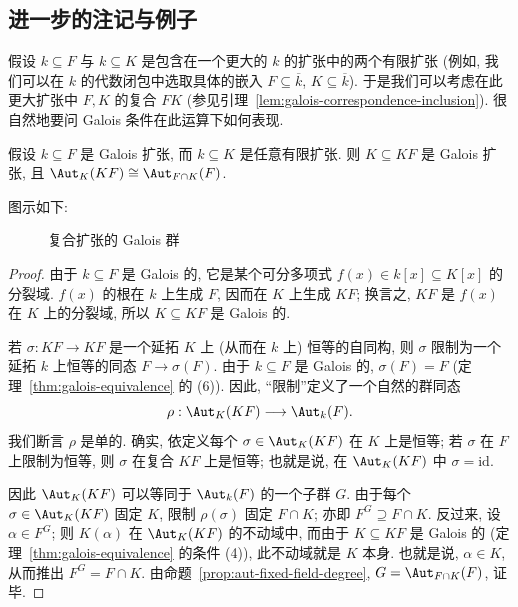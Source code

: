 \subsection{进一步的注记与例子}\label{subsec:galois-further}

假设 $k\subseteq F$ 与 $k\subseteq K$ 是包含在一个更大的 $k$ 的扩张中的两个有限扩张 (例如, 我们可以在 $k$ 的代数闭包中选取具体的嵌入 $F\subseteq\overline{k}$, $K\subseteq\overline{k}$). 于是我们可以考虑在此更大扩张中 $F,K$ 的复合 $FK$ (参见引理~\ref{lem:galois-correspondence-inclusion}). 很自然地要问 Galois 条件在此运算下如何表现.

\begin{proposition}\label{prop:composite-galois}
假设 $k\subseteq F$ 是 Galois 扩张, 而 $k\subseteq K$ 是任意有限扩张. 则 $K\subseteq KF$ 是 Galois 扩张, 且 $\Aut_K(KF)\cong\Aut_{F\cap K}(F)$.
\end{proposition}

图示如下:

\begin{figure}[h]
\centering
{}
\caption{复合扩张的 Galois 群}
\label{fig:prop617-composite}
\end{figure}

\begin{proof}
由于 $k\subseteq F$ 是 Galois 的, 它是某个可分多项式 $f(x)\in k[x]\subseteq K[x]$ 的分裂域. $f(x)$ 的根在 $k$ 上生成 $F$, 因而在 $K$ 上生成 $KF$; 换言之, $KF$ 是 $f(x)$ 在 $K$ 上的分裂域, 所以 $K\subseteq KF$ 是 Galois 的.

若 $\sigma:KF\to KF$ 是一个延拓 $K$ 上 (从而在 $k$ 上) 恒等的自同构, 则 $\sigma$ 限制为一个延拓 $k$ 上恒等的同态 $F\to\sigma(F)$. 由于 $k\subseteq F$ 是 Galois 的, $\sigma(F)=F$ (定理~\ref{thm:galois-equivalence} 的 (6)). 因此, ``限制''定义了一个自然的群同态
\[
\rho:\Aut_K(KF)\longrightarrow\Aut_k(F).
\]
我们断言 $\rho$ 是单的. 确实, 依定义每个 $\sigma\in\Aut_K(KF)$ 在 $K$ 上是恒等; 若 $\sigma$ 在 $F$ 上限制为恒等, 则 $\sigma$ 在复合 $KF$ 上是恒等; 也就是说, 在 $\Aut_K(KF)$ 中 $\sigma=\mathrm{id}$.

因此 $\Aut_K(KF)$ 可以等同于 $\Aut_k(F)$ 的一个子群 $G$. 由于每个 $\sigma\in\Aut_K(KF)$ 固定 $K$, 限制 $\rho(\sigma)$ 固定 $F\cap K$; 亦即 $F^G\supseteq F\cap K$. 反过来, 设 $\alpha\in F^G$; 则 $K(\alpha)$ 在 $\Aut_K(KF)$ 的不动域中, 而由于 $K\subseteq KF$ 是 Galois 的 (定理~\ref{thm:galois-equivalence} 的条件 (4)), 此不动域就是 $K$ 本身. 也就是说, $\alpha\in K$, 从而推出 $F^G=F\cap K$. 由命题~\ref{prop:aut-fixed-field-degree}, $G=\Aut_{F\cap K}(F)$, 证毕.
\end{proof}

